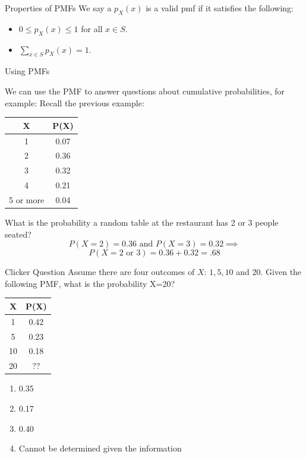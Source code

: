 \documentclass{beamer}
\begin{document}
\begin{frame}{Properties of PMFs}
	We say a $p_X(x)$ is a \alert{valid} pmf if it satisfies the following:
				
	\begin{itemize}
		\item $0 \leq p_X(x) \leq 1$ for all $x \in S$.
		\item $\displaystyle\sum_{x \in S} p_X(x) = 1.$
	\end{itemize}
\end{frame}

\begin{frame}{Using PMFs}

	We can use the PMF to answer questions about cumulative probabilities, for example:
	Recall the previous example:

	\begin{center}
		\begin{tabular}{|c|c|}
			\hline
			X         & P(X) \\
			\hline
			1         & 0.07 \\
			2         & 0.36 \\
			3         & 0.32 \\
			4         & 0.21 \\
			5 or more & 0.04 \\
			\hline
		\end{tabular}
	\end{center}
	
	What is the probability a random table at the restaurant has 2 or 3 people seated?
	\[ 
		P(X=2) = 0.36 \text{ and } P(X=3) = 0.32 \implies 
	\]
	\[ 
		P(X=2 \text{ or } 3) = 0.36 + 0.32 = .68 
	\]
	
\end{frame}

\begin{frame}{Clicker Question}
	Assume there are four outcomes of $X$: $1, 5, 10$ and $20$. Given the following PMF, what is the probability X=20?
	\begin{center}
		\begin{tabular}{|c|c|}
			\hline
			X  & P(X) \\
			\hline
			1  & 0.42 \\
			5  & 0.23 \\
			10 & 0.18 \\
			20 & ??   \\
			\hline
		\end{tabular}
	\end{center}
	
	\begin{enumerate}[label=(\alph*)]
		\item 0.35
		\item 0.17
		\item 0.40
		\item Cannot be determined given the information
	\end{enumerate}
\end{frame}
\end{document}
